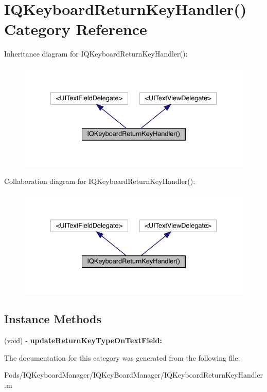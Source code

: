 \hypertarget{category_i_q_keyboard_return_key_handler_07_08}{}\section{I\+Q\+Keyboard\+Return\+Key\+Handler() Category Reference}
\label{category_i_q_keyboard_return_key_handler_07_08}


Inheritance diagram for I\+Q\+Keyboard\+Return\+Key\+Handler()\+:\nopagebreak
\begin{figure}[H]
\begin{center}
\leavevmode
\includegraphics[width=334pt]{category_i_q_keyboard_return_key_handler_07_08__inherit__graph}
\end{center}
\end{figure}


Collaboration diagram for I\+Q\+Keyboard\+Return\+Key\+Handler()\+:\nopagebreak
\begin{figure}[H]
\begin{center}
\leavevmode
\includegraphics[width=334pt]{category_i_q_keyboard_return_key_handler_07_08__coll__graph}
\end{center}
\end{figure}
\subsection*{Instance Methods}
\begin{DoxyCompactItemize}
\item 
\mbox{\label{category_i_q_keyboard_return_key_handler_07_08_aa1bc4001b56a311ae185d1e92ac73bf5}} 
(void) -\/ {\bfseries update\+Return\+Key\+Type\+On\+Text\+Field\+:}
\end{DoxyCompactItemize}


The documentation for this category was generated from the following file\+:\begin{DoxyCompactItemize}
\item 
Pods/\+I\+Q\+Keyboard\+Manager/\+I\+Q\+Key\+Board\+Manager/I\+Q\+Keyboard\+Return\+Key\+Handler.\+m\end{DoxyCompactItemize}
